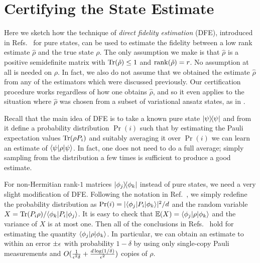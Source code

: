 

\section{Certifying the State Estimate}\label{S:cert}


Here we sketch how the technique of \emph{direct fidelity estimation} (DFE), introduced in Refs.~\cite{Flammia2011, daSilva2011} for pure states, can be used to estimate the fidelity between a low rank estimate $\hat\rho$ and the true state $\rho$. The only assumption we make is that $\hat\rho$ is a positive semidefinite matrix with $\mathrm{Tr}(\hat\rho) \le 1$ and $\operatorname{rank}(\hat\rho) = r$. No assumption at all is needed on $\rho$. In fact, we also do not assume that we obtained the estimate $\hat\rho$ from any of the estimators which were discussed previously. Our certification procedure works regardless of how one obtains $\hat\rho$, and so it even applies to the situation where $\hat\rho$ was chosen from a subset of variational ansatz states, as in \cite{Cramer2010a}.

Recall that the main idea of DFE is to take a known pure state $|{\psi}\rangle\!\langle{\psi}|$ and from it define a probability distribution $\Pr(i)$ such that by estimating the Pauli expectation values $\mathrm{Tr}(\rho P_i)$ and suitably averaging it over $\Pr(i)$ we can learn an estimate of  $\langle{\psi}|\rho|{\psi}\rangle$. In fact, one does not need to do a full average; simply sampling from the distribution a few times is sufficient to produce a good estimate. 

For non-Hermitian rank-$1$ matrices $|{\phi_j}\rangle\!\langle{\phi_k}|$ instead of pure states, we need a very slight modification of DFE. Following the notation in Ref.~\cite{Flammia2011}, we simply redefine the probability distribution as $\Pr(i) = \lvert\langle{\phi_j}|P_i|{\phi_k}\rangle\rvert^2/d$ and the random variable $X = \mathrm{Tr}(P_i \rho)/\langle{\phi_k}|P_i|{\phi_j}\rangle$. It is easy to check that $\mathbb{E}(X) = \langle{\phi_j}|\rho|{\phi_k}\rangle$ and the variance of $X$ is at most one. Then all of the conclusions in Refs.~\cite{Flammia2011, daSilva2011} hold for estimating the quantity $\langle{\phi_j}|\rho|{\phi_k}\rangle$. In particular, we can obtain an estimate to within an error $\pm \epsilon$ with probability $1-\delta$ by using only single-copy Pauli measurements and $O(\frac{1}{\epsilon^2\delta} + \frac{d \log(1/\delta)}{\epsilon^2})$ copies of $\rho$.

